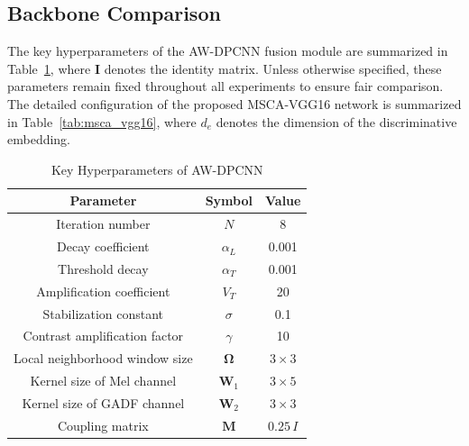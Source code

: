 \documentclass[journal]{IEEEtran}
\begin{document}
\subsection{Backbone Comparison}
The key hyperparameters of the AW-DPCNN fusion module are summarized in Table~\ref{tab:awdpcnn_params}, where $\mathbf I$ denotes the identity matrix. Unless otherwise specified, these parameters remain fixed throughout all experiments to ensure fair comparison. The detailed configuration of the proposed MSCA-VGG16 network is summarized in Table~\ref{tab:msca_vgg16}, where $d_e$ denotes the dimension of the discriminative embedding.
\begin{table}
	\centering
	\caption{Key Hyperparameters of AW-DPCNN}
	\label{tab:awdpcnn_params}
	\begin{tabular}{ccc}
		\hline
		\textbf{Parameter} & \textbf{Symbol} & \textbf{Value} \\
		\hline
		Iteration number & $N$ & 8 \\
		Decay coefficient & $\alpha_L$ & 0.001 \\
		Threshold decay & $\alpha_T$ & 0.001 \\
		Amplification coefficient & $V_T$ & 20 \\
		Stabilization constant & $\sigma$ & 0.1 \\
		Contrast amplification factor & $\gamma$ & 10 \\
		Local neighborhood window size & $\boldsymbol{\Omega}$ & $3 \times 3$ \\
		Kernel size of Mel channel & $\boldsymbol{W}_1$ & $3 \times 5$ \\
		Kernel size of GADF channel & $\boldsymbol{W}_2$ & $3 \times 3$ \\
		Coupling matrix & $\boldsymbol{M}$ & $$0.25\,I$$ \\
		\hline
	\end{tabular}
\end{table}
\end{document}
